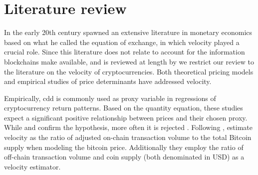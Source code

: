 \section{Literature review}\label{sec:lit}%

In the early 20th century \cite{fisher1911equation,fisher1922purch} spawned an extensive literature in
monetary economics based on what he called the equation of exchange, in which
velocity played a crucial role.  Since this literature does not relate to
account for the information blockchains make available, and is reviewed at
length by \cite{friedman2017quantity} we restrict our review to the
literature on the velocity of cryptocurrencies.  Both theoretical pricing
models and empirical studies of price determinants have addressed velocity.

Empirically, \ac{cdd} is commonly used as proxy variable in regressions of
cryptocurrency return patterns. %
Based on the quantity equation, these studies expect a significant positive
relationship between prices and their chosen proxy. %
While \cite{kancs2015digital} and \cite{ciaian2016digital} confirm the
hypothesis, more often it is rejected
\citep{deleo2014does,georgoula2015using,bouoiyour2015does,ciaian2016economics,luis2019drivers}.
Following \cite{fisher1911equation}, \cite{athey2016bitcoin} estimate
velocity as the ratio of adjusted on-chain transaction volume to the total
Bitcoin supply when modeling the bitcoin price. %
Additionally they employ the ratio of off-chain transaction volume and coin
supply (both denominated in USD) as a velocity estimator. %
